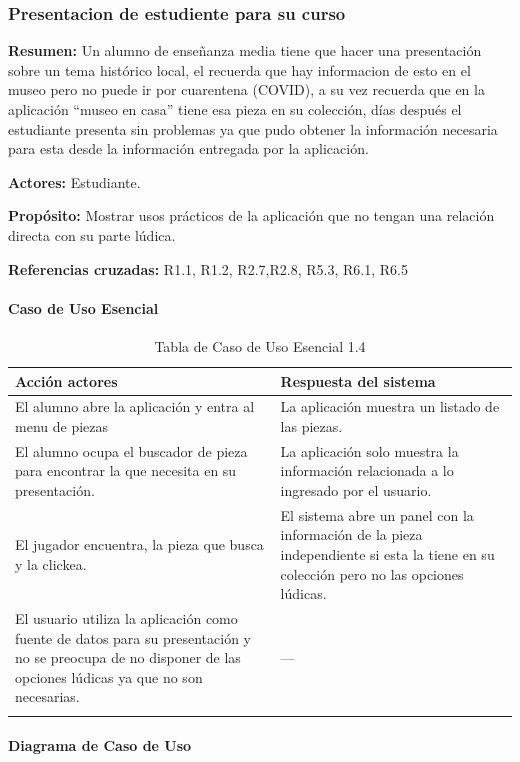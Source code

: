 \subsubsection{Presentacion de estudiente para su curso}

{\textbf {Resumen:}}
Un alumno de enseñanza media tiene que hacer una presentación sobre un tema histórico local, el recuerda que hay informacion de esto en el museo pero no puede ir por cuarentena (COVID), a su vez recuerda que en la aplicación “museo en casa” tiene esa pieza en su colección, días después el estudiante presenta sin problemas ya que pudo obtener la información necesaria para esta desde la información entregada por la aplicación.

{\textbf {Actores:}}
Estudiante.

{\textbf {Propósito:}}
Mostrar usos prácticos de la aplicación que no tengan una relación directa con su parte lúdica.

{\textbf {Referencias cruzadas:}}
R1.1, R1.2, R2.7,R2.8, R5.3, R6.1, R6.5

\paragraph{Caso de Uso Esencial}

\begin{longtable}{|p{5cm}|p{8cm}|}
\hline 
Acción actores & Respuesta del sistema \\ 
\hline 
El alumno abre la aplicación y entra al menu de piezas & La aplicación muestra un listado de las piezas. \\ 
\hline
El alumno ocupa el buscador de pieza para encontrar la que necesita en su presentación. & La aplicación solo muestra la información relacionada a lo ingresado por el usuario. \\ 
\hline 
El jugador encuentra, la pieza que busca y la clickea. & El sistema abre un panel con la información de la pieza independiente si esta la tiene en su colección pero no las opciones lúdicas. \\ 
\hline 
El usuario utiliza la aplicación como fuente de datos para su presentación y no se preocupa de no disponer de las opciones lúdicas ya que no son necesarias. & --- \\ 
\hline 
\caption{Tabla de Caso de Uso Esencial 1.4}
\label{tab24}
\end{longtable}

\paragraph{Diagrama de Caso de Uso}

